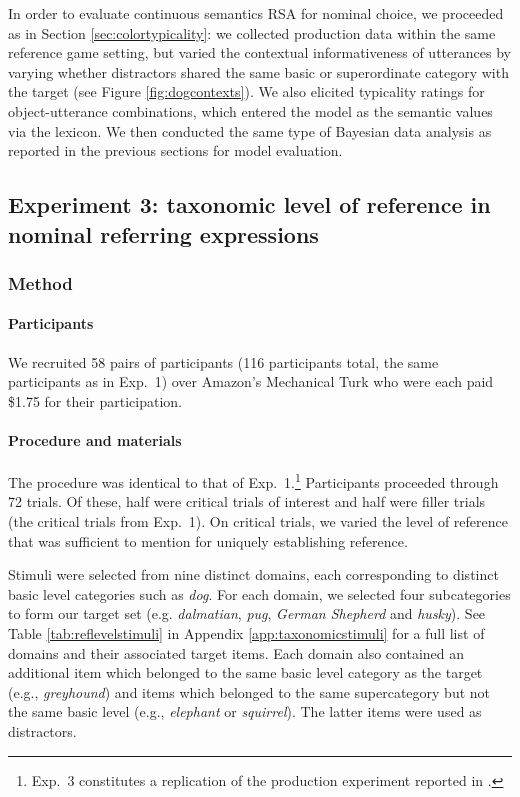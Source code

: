 \documentclass[11pt]{article}
\newcommand{\tableref}[1]{Table \ref{#1}}
\newcommand{\figref}[1]{Figure \ref{#1}}
\newcommand{\appref}[1]{Appendix \ref{#1}}
\newcommand{\sectionref}[1]{Section \ref{#1}}
\begin{document}
In order to evaluate continuous semantics RSA for nominal choice, we proceeded as in \sectionref{sec:colortypicality}: we collected production data within the same reference game setting, but varied the contextual informativeness of utterances by varying whether distractors shared the same basic or superordinate category with the target (see \figref{fig:dogcontexts}). We also elicited typicality ratings for object-utterance combinations, which entered the model as the semantic values via the lexicon. We then conducted the same type of Bayesian data analysis as reported in the previous sections for model evaluation.

\subsection{Experiment 3: taxonomic level of reference in nominal referring expressions}
\label{sec:exp3}

\subsubsection{Method}

\paragraph{Participants}

We recruited 58 pairs of participants (116 participants total, the same participants as in Exp.~1) over Amazon's Mechanical Turk who were each paid \$1.75 for their participation. 

\paragraph{Procedure and materials}

The procedure was identical to that of Exp.~1.\footnote{Exp.~3 constitutes a replication of the production experiment reported in .} Participants proceeded through 72 trials. Of these, half were critical trials of interest and half were filler trials (the critical trials from Exp.~1). On critical trials, we varied the level of reference that was sufficient to mention for uniquely establishing reference.

Stimuli were selected from nine distinct domains, each corresponding to distinct basic level categories such as \emph{dog}.  For each domain, we selected four subcategories to form our target set (e.g. \emph{dalmatian}, \emph{pug}, \emph{German Shepherd} and \emph{husky}). See \tableref{tab:reflevelstimuli} in \appref{app:taxonomicstimuli} for a full list of domains and their associated target items. Each domain also contained an additional item which belonged to the same basic level category as the target (e.g., \emph{greyhound}) and items which belonged to the same supercategory but not the same basic level (e.g., \emph{elephant} or \emph{squirrel}). The latter items were used as distractors.
\end{document}
